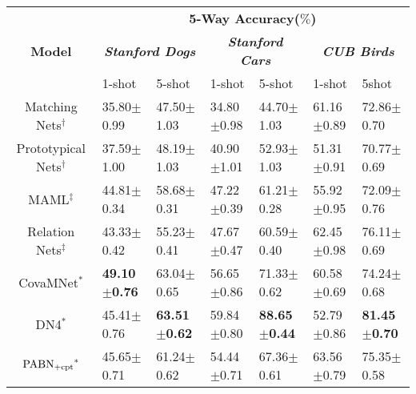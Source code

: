 \documentclass[final]{cvpr}
\begin{document}
	\begin{table*}
		\centering
		\begin{tabular}{c  p{1.8cm}<{\centering}  p{1.8cm}<{\centering}  p{1.8cm}<{\centering}  p{1.8cm}<{\centering}  p{1.8 cm}<{\centering}  p{1.8cm}<{\centering} }
			\toprule
			\multirow{3}{*}{\textbf{Model}} & \multicolumn{6}{c}{\textbf{5-Way Accuracy($\%$)}}
			\\
			\cmidrule{2-7}
			&\multicolumn{2}{c}{\emph{\textbf{Stanford Dogs}}} &\multicolumn{2}{c}{\emph{\textbf{Stanford Cars}}} 
			&\multicolumn{2}{c}{\emph{\textbf{CUB Birds}}} \\
			& 1-shot& 5-shot & 1-shot & 5-shot & 1-shot & 5shot\\
			\midrule Matching Nets$^\dagger$ \cite{vinyals2016matching} & 35.80$\pm$\footnotesize{0.99} & 47.50$\pm$\footnotesize{1.03}  & 34.80$\pm$\footnotesize{0.98} & 44.70$\pm$\footnotesize{1.03}  & 61.16$\pm$\footnotesize{0.89} & 72.86$\pm$\footnotesize{0.70} \\
			Prototypical Nets$^\dagger$ \cite{snell2017prototypical}& 37.59$\pm$\footnotesize{1.00} & 48.19$\pm$\footnotesize{1.03}  & 40.90$\pm$\footnotesize{1.01} & 52.93$\pm$\footnotesize{1.03} & 51.31$\pm$\footnotesize{0.91} & 70.77$\pm$\footnotesize{0.69}  \\
MAML$^\ddagger$ \cite{finn2017model} & 44.81$\pm$\footnotesize{0.34} & 58.68$\pm$\footnotesize{0.31} &47.22$\pm$\footnotesize{0.39} & 61.21$\pm$\footnotesize{0.28} & 55.92$\pm$\footnotesize{0.95}  &  72.09$\pm$\footnotesize{0.76} \\
			Relation Nets$^\ddagger$ \cite{sung2018learning} & 43.33$\pm$\footnotesize{0.42} & 55.23$\pm$\footnotesize{0.41} & 47.67$\pm$\footnotesize{0.47}  & 60.59$\pm$\footnotesize{0.40} & 62.45$\pm$\footnotesize{0.98}  & 76.11$\pm$\footnotesize{0.69} \\
CovaMNet$^*$  \cite{li2019distribution} & \textbf{49.10}$\pm$\textbf{\footnotesize{0.76}}  & 63.04$\pm$\footnotesize{0.65} & 56.65$\pm$\footnotesize{0.86} & 71.33$\pm$\footnotesize{0.62}  & 60.58$\pm$\footnotesize{0.69} & 74.24$\pm$\footnotesize{0.68} \\
			DN4$^*$  \cite{li2019revisiting} & 45.41$\pm$\footnotesize{0.76} & \textbf{63.51}$\pm$\textbf{\footnotesize{0.62}}  & 59.84$\pm$\footnotesize{0.80} & \textbf{88.65}$\pm$\textbf{\footnotesize{0.44}}  & 52.79$\pm$\footnotesize{0.86} & \textbf{81.45}$\pm$\textbf{\footnotesize{0.70}}  \\
			\midrule
			$\rm {PABN_{+cpt}}^*$ \cite{huang2020low} & 45.65$\pm$\footnotesize{0.71} & 61.24$\pm$\footnotesize{0.62} & 54.44$\pm$\footnotesize{0.71}  & 67.36$\pm$\footnotesize{0.61}  & 63.56$\pm$\footnotesize{0.79} & 75.35$\pm$\footnotesize{0.58} \\

\end{tabular}
\end{table*}
\end{document}
